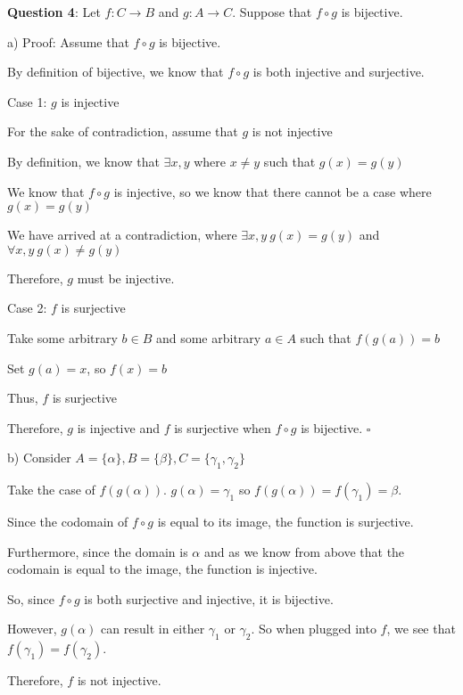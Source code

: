 \documentclass{article} %
\newcommand{\question}[2][]{\begin{flushleft}
        \textbf{Question #1}: #2

\end{flushleft}}
\begin{document}
    \question[4]{Let $f: C \rightarrow B$ and $g: A \rightarrow C$. Suppose that $f \circ g$ is bijective.} 

    a) Proof: Assume that $f \circ g$ is bijective.

    By definition of bijective, we know that $f \circ g$ is both injective and surjective.

    Case 1: $g$ is injective

    \tabto*{1cm} For the sake of contradiction, assume that $g$ is not injective

    \tabto*{1cm} By definition, we know that $\exists x, y$ where $x \neq y$ such that $g(x) = g(y)$

    \tabto*{1cm} We know that $f \circ g$ is injective, so we know that there cannot be a case where $g(x) = g(y)$

    \tabto*{1cm} We have arrived at a contradiction, where $\exists x, y\ g(x) = g(y)$ and $\forall x, y\ g(x) \neq g(y)$
 
    \tabto*{1cm} Therefore, $g$ must be injective.

    Case 2: $f$ is surjective

    \tabto*{1cm} Take some arbitrary $b \in B$ and some arbitrary $a \in A$ such that $f(g(a)) = b$

    \tabto*{1cm} Set $g(a) = x$, so $f(x) = b$

    \tabto*{1cm} Thus, $f$ is surjective

    Therefore, $g$ is injective and $f$ is surjective when $f \circ g$ is bijective. $\square$

    b) Consider $A = \{\alpha\}, B = \{\beta\}, C = \{\gamma_1, \gamma_2\}$

    Take the case of $f(g(\alpha))$. $g(\alpha) = \gamma_1$ so $f(g(\alpha)) = f(\gamma_1) = \beta$.
    
    Since the codomain of $f \circ g$ is equal to its image, the function is surjective.

    Furthermore, since the domain is $\alpha$ and as we know from above that the codomain is equal to 
    \tabto{0.5cm}the image, the function is injective.

    So, since $f \circ g$ is both surjective and injective, it is bijective.
    
    However, $g(\alpha)$ can result in either $\gamma_1$ or $\gamma_2$. So when plugged into $f$, we see that $f(\gamma_1) = f(\gamma_2)$.

    Therefore, $f$ is not injective.
\end{document}
